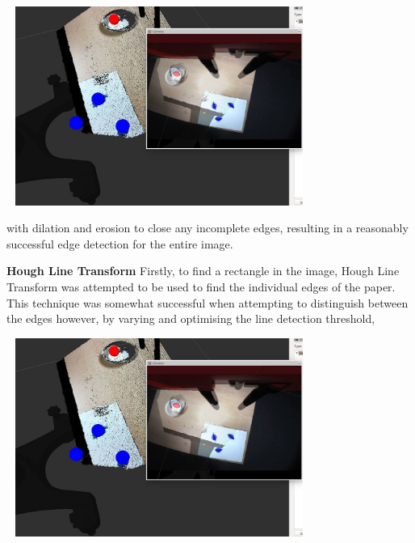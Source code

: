 \hspace{0.5cm}
\begin{minipage}[t]{0.64\textwidth}
\smallskip
\centering
\includegraphics[width = 10cm, height = 6.5cm]{sweettransformation.jpg}
\centering
{}
\bigskip
\end{minipage}
with dilation and erosion to close any incomplete edges, resulting in a reasonably successful edge detection for the entire image.
\newline
\newline
\begin{minipage}[t]{0.30\textwidth}
\raggedright
\smallskip
\textbf{Hough Line Transform}
\newline
Firstly, to find a rectangle in the image, Hough Line Transform was attempted to be used to find the individual edges of the paper. This technique was somewhat successful when attempting to distinguish between the edges however, by varying and optimising the line detection threshold, 
\smallskip
\end{minipage}
\hspace{0.5cm}
\begin{minipage}[t]{0.64\textwidth}
\smallskip
\centering
\includegraphics[width = 10cm, height = 6.5cm]{sweettransformation.jpg}
\centering
{}
\bigskip
\end{minipage}
